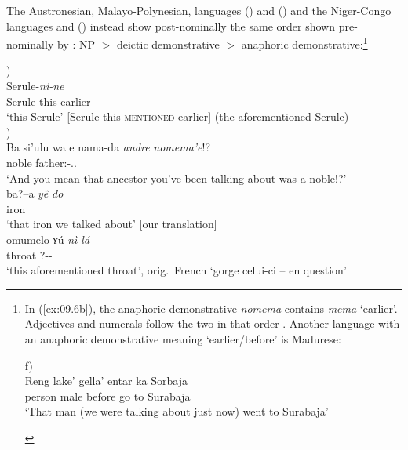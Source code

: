 \documentclass[output=paper]{langsci/langscibook}
\begin{document}
The Austronesian, Malayo-Polynesian, languages 
(\citealt{Eades2005}) and  (\citealt{Brown2005}) and the
Niger-Congo languages  \citep{Fabre2004} and
 (\citealt{Paluku1998}) instead show post-nominally
the same order shown pre-nom\-i\-nal\-ly by : NP $>$ deictic demonstrative
$>$ anaphoric demonstrative:\footnote{In (\ref{ex:09.6b}), the anaphoric
    demonstrative \emph{nomema} contains \emph{mema} ‘earlier’.  Adjectives and
    numerals follow the two  in that order
    \parencite[412]{Brown2001}.  Another language with an anaphoric
    demonstrative meaning ‘earlier/before’ is Madurese:

        \begin{exe}  \parencite[192]{Davies2010}f)\\ %
                \gll Reng   lake’ gella’ entar ka Sorbaja \\
                     person male before   go  to Surabaja \\
                \glt ‘That man (we were talking about just now) went to
            Surabaja’
        \end{exe}}

\ea\label{ex:09.6}
\ea\label{ex:09.6a} \parencite[225]{Eades2005})\\
		\gll Serule-\textit{ni-ne}\\
			    Serule-this-earlier\\
		\glt ‘this Serule’ [Serule-this-\textsc{mentioned} earlier] (the aforementioned Serule)\\
        \ex\label{ex:09.6b} \parencite[579]{Brown2005})\\
		\gll Ba  si'ulu  wa  e  nama-da  \textit{andre} \textit{nomema'e}!?\\
            \Cnj{} noble \Dptcl{} \Dptcl{} father:\Mut{}-\Fpl.\Incl.\Poss{} {\Dem{}} {\Dem{}}\\
		\glt ‘And you mean that ancestor you’ve been talking about was a noble!?’
        \ex\label{ex:09.6c} \parencite[173]{Fabre2004}\\
		\gll b\=a?–\=a \textit{yê} \textit{d\=o}\\
			    iron {\Dem{}} {\Dem{}}\\
		\glt ‘that iron we talked about’ [our translation]
    \ex\label{ex:09.6d} \parencite[203]{Paluku1998}\\
		\gll omumelo  ɤú-\textit{nì-lá}\\
            throat  \textsc{?}-{\Dem{}}-{\Dem{}}\\
		\glt ‘this aforementioned throat’, orig.\ French \enquote*{gorge celui-ci – en question}
	\z
\z
\end{document}
